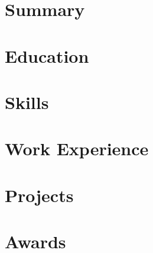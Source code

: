 \documentclass[a4paper,11pt]{article}
\begin{document}
\newcommand{\resumeRole}{AI Engineer}
\newcommand{\resumeJobTitleGulzar}{Python Developer}



\section{Summary}


\section{Education}


\vspace{-15pt}
\section{Skills}


\section{Work Experience}
\resumeSubHeadingListStart
  
  \newpage
  
  
  
\resumeSubHeadingListEnd

\section{Projects}
\resumeSubHeadingListStart
  
  
\resumeSubHeadingListEnd

\section{Awards}

\end{document}
